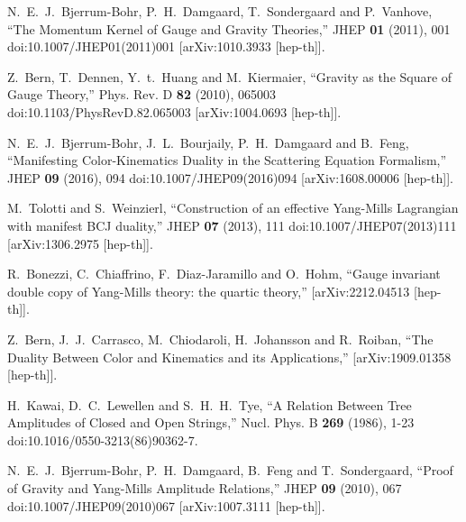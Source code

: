 N.~E.~J.~Bjerrum-Bohr, P.~H.~Damgaard, T.~Sondergaard and P.~Vanhove,
``The Momentum Kernel of Gauge and Gravity Theories,''
JHEP \textbf{01} (2011), 001
doi:10.1007/JHEP01(2011)001
[arXiv:1010.3933 [hep-th]].

Z.~Bern, T.~Dennen, Y.~t.~Huang and M.~Kiermaier,
``Gravity as the Square of Gauge Theory,''
Phys. Rev. D \textbf{82} (2010), 065003
doi:10.1103/PhysRevD.82.065003
[arXiv:1004.0693 [hep-th]].

N.~E.~J.~Bjerrum-Bohr, J.~L.~Bourjaily, P.~H.~Damgaard and B.~Feng,
``Manifesting Color-Kinematics Duality in the Scattering Equation Formalism,''
JHEP \textbf{09} (2016), 094
doi:10.1007/JHEP09(2016)094
[arXiv:1608.00006 [hep-th]].

M.~Tolotti and S.~Weinzierl,
``Construction of an effective Yang-Mills Lagrangian with manifest BCJ duality,''
JHEP \textbf{07} (2013), 111
doi:10.1007/JHEP07(2013)111
[arXiv:1306.2975 [hep-th]].

R.~Bonezzi, C.~Chiaffrino, F.~Diaz-Jaramillo and O.~Hohm,
``Gauge invariant double copy of Yang-Mills theory: the quartic theory,''
[arXiv:2212.04513 [hep-th]].

Z.~Bern, J.~J.~Carrasco, M.~Chiodaroli, H.~Johansson and R.~Roiban,
``The Duality Between Color and Kinematics and its Applications,''
[arXiv:1909.01358 [hep-th]].

H.~Kawai, D.~C.~Lewellen and S.~H.~H.~Tye,
``A Relation Between Tree Amplitudes of Closed and Open Strings,''
Nucl. Phys. B \textbf{269} (1986), 1-23
doi:10.1016/0550-3213(86)90362-7.

N.~E.~J.~Bjerrum-Bohr, P.~H.~Damgaard, B.~Feng and T.~Sondergaard,
``Proof of Gravity and Yang-Mills Amplitude Relations,''
JHEP \textbf{09} (2010), 067
doi:10.1007/JHEP09(2010)067
[arXiv:1007.3111 [hep-th]].